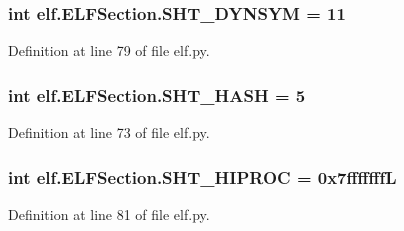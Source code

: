 \subsubsection[{\texorpdfstring{S\+H\+T\+\_\+\+D\+Y\+N\+S\+YM}{SHT_DYNSYM}}]{\setlength{\rightskip}{0pt plus 5cm}int elf.\+E\+L\+F\+Section.\+S\+H\+T\+\_\+\+D\+Y\+N\+S\+YM = 11\hspace{0.3cm}{\ttfamily [static]}}\hypertarget{clasself_1_1_e_l_f_section_ac369abab49e0ddc973c6fc303f748c9f}{}\label{clasself_1_1_e_l_f_section_ac369abab49e0ddc973c6fc303f748c9f}


Definition at line 79 of file elf.\+py.

\subsubsection[{\texorpdfstring{S\+H\+T\+\_\+\+H\+A\+SH}{SHT_HASH}}]{\setlength{\rightskip}{0pt plus 5cm}int elf.\+E\+L\+F\+Section.\+S\+H\+T\+\_\+\+H\+A\+SH = 5\hspace{0.3cm}{\ttfamily [static]}}\hypertarget{clasself_1_1_e_l_f_section_a0c933de0c931080b0998c07c2814c888}{}\label{clasself_1_1_e_l_f_section_a0c933de0c931080b0998c07c2814c888}


Definition at line 73 of file elf.\+py.

\subsubsection[{\texorpdfstring{S\+H\+T\+\_\+\+H\+I\+P\+R\+OC}{SHT_HIPROC}}]{\setlength{\rightskip}{0pt plus 5cm}int elf.\+E\+L\+F\+Section.\+S\+H\+T\+\_\+\+H\+I\+P\+R\+OC = 0x7fffffffL\hspace{0.3cm}{\ttfamily [static]}}\hypertarget{clasself_1_1_e_l_f_section_a63f758ebb9ada842c2ae9dca2de6ca51}{}\label{clasself_1_1_e_l_f_section_a63f758ebb9ada842c2ae9dca2de6ca51}


Definition at line 81 of file elf.\+py.

